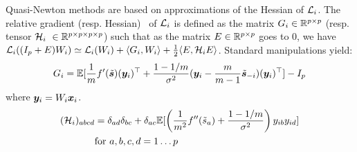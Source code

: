 Quasi-Newton methods are based on approximations of the Hessian of $\mathcal{L}_i$.
%
The relative gradient (resp. Hessian)~\cite{amari1996new, cardoso1996equivariant} of $\mathcal{L}_i$ is defined as the matrix $G_i\in \mathbb{R}^{p \times p}$ (resp. tensor $\mathcal{H}_i \in \bbR^{p\times p\times p\times p}$) such that as the matrix $E\in\mathbb{R}^{p\times p}$ goes to $0$, we have $\mathcal{L}_i((I_p + E)W_i) \simeq \mathcal{L}_i(W_i) + \langle{ G_i},{ W_i}\rangle + \frac12\langle{ E},{ \mathcal{H}_iE}\rangle$. Standard manipulations yield:
\begin{equation}
    \label{eq:gradient}
    G_i = \mathbb{E}[\frac1mf'(\tilde{\boldsymbol{s}})(\boldsymbol{y}_i)^{\top} + \frac{1 - 1 /m}{\sigma^2}(\boldsymbol{y}_i - \frac{m}{m-1}\tilde{\boldsymbol{s}}_{-i})(\boldsymbol{y}_i)^{\top}] - I_p 
\end{equation}
where $\boldsymbol{y}_i= W_i\boldsymbol{x}_i$.
\begin{align}
    \label{eq:hessian}
    (\mathcal{H}_i)_{abcd} &= \delta_{ad}\delta_{bc} + \delta_{ac}\mathbb{E}[\left(\frac{1}{m^2}f''(\tilde{s}_a) + \frac{1 - 1/m}{\sigma^2}\right)y_{ib}y_{id}] \\ &\text{for }a, b, c, d =1\dots p \nonumber
\end{align}

